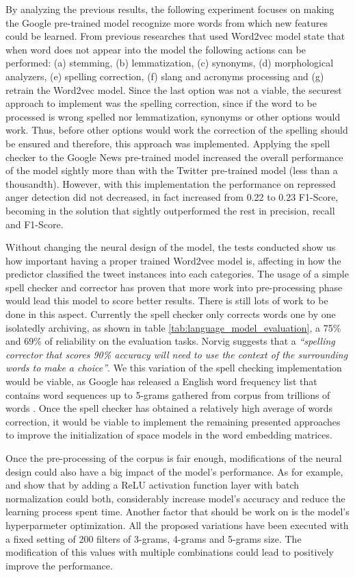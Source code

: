 By analyzing the previous results, the following experiment focuses on making the Google pre-trained model recognize more words from which new features could be learned. From previous researches that used Word2vec model state that when word does not appear into the model the following actions can be performed: (a) stemming, (b) lemmatization, (c) synonyms, (d) morphological analyzers, (e) spelling correction, (f) slang and acronyms processing and (g) retrain the Word2vec model. Since the last option was not a viable, the securest approach to implement was the spelling correction, since if the word to be processed is wrong spelled nor lemmatization, synonyms or other options would work. Thus, before other options would work the correction of the spelling should be ensured and therefore, this approach was implemented. Applying the spell checker to the Google News pre-trained model increased the overall performance of the model sightly more than with the Twitter pre-trained model (less than a thousandth). However, with this implementation the performance on repressed anger detection did not decreased, in fact increased from 0.22 to 0.23 F1-Score, becoming in the solution that sightly outperformed the rest in precision, recall and F1-Score.

Without changing the neural design of the model, the tests conducted show us how important having a proper trained Word2vec model is, affecting in how the predictor classified the tweet instances into each categories. The usage of a simple spell checker and corrector has proven that more work into pre-processing phase would lead this model to score better results. There is still lots of work to be done in this aspect. Currently the spell checker only corrects words one by one isolatedly archiving, as shown in table \ref{tab:language_model_evaluation}, a 75\% and 69\% of reliability on the evaluation tasks. Norvig suggests that a \textit{``spelling corrector that scores 90\% accuracy will need to use the context of the surrounding words to make a choice''}. We this variation of the spell checking implementation would be viable, as Google has released a English word frequency list that contains word sequences up to 5-grams gathered from corpus from trillions of words \cite{LDCGoogle5-gram}. Once the spell checker has obtained a relatively high average of words correction, it would be viable to implement the remaining presented approaches to improve the initialization of space models in the word embedding matrices.

Once the pre-processing of the corpus is fair enough, modifications of the neural design could also have a big impact of the model's performance. As for example, \cite{ioffe2015batch} and \cite{ba2016layer} show that by adding a ReLU activation function layer with batch normalization could both, considerably increase model's accuracy and reduce the learning process spent time. Another factor that should be work on is the model's hyperparmeter optimization. All the proposed variations have been executed with a fixed setting of 200 filters of 3-grams, 4-grams and 5-grams size. The modification of this values with multiple combinations could lead to positively improve the performance.


